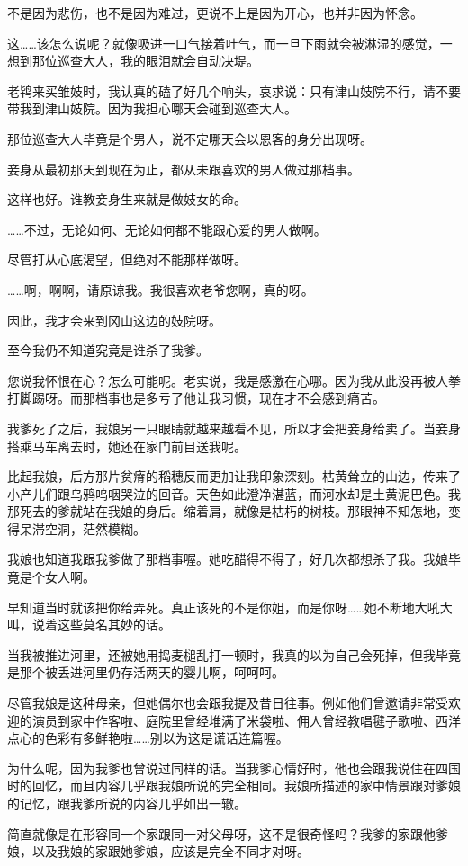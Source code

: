 \documentclass[portrait,a4paper]{article}
\begin{document}
不是因为悲伤，也不是因为难过，更说不上是因为开心，也并非因为怀念。

这……该怎么说呢？就像吸进一口气接着吐气，而一旦下雨就会被淋湿的感觉，一想到那位巡查大人，我的眼泪就会自动决堤。

老鸨来买雏妓时，我认真的磕了好几个响头，哀求说：只有津山妓院不行，请不要带我到津山妓院。因为我担心哪天会碰到巡查大人。

那位巡查大人毕竟是个男人，说不定哪天会以恩客的身分出现呀。

妾身从最初那天到现在为止，都从未跟喜欢的男人做过那档事。

这样也好。谁教妾身生来就是做妓女的命。

……不过，无论如何、无论如何都不能跟心爱的男人做啊。

尽管打从心底渴望，但绝对不能那样做呀。

……啊，啊啊，请原谅我。我很喜欢老爷您啊，真的呀。

因此，我才会来到冈山这边的妓院呀。

至今我仍不知道究竟是谁杀了我爹。

您说我怀恨在心？怎么可能呢。老实说，我是感激在心哪。因为我从此没再被人拳打脚踢呀。而那档事也是多亏了他让我习惯，现在才不会感到痛苦。

我爹死了之后，我娘另一只眼睛就越来越看不见，所以才会把妾身给卖了。当妾身搭乘马车离去时，她还在家门前目送我呢。

比起我娘，后方那片贫瘠的稻穗反而更加让我印象深刻。枯黄耸立的山边，传来了小产儿们跟乌鸦呜咽哭泣的回音。天色如此澄净湛蓝，而河水却是土黄泥巴色。我那死去的爹就站在我娘的身后。缩着肩，就像是枯朽的树枝。那眼神不知怎地，变得呆滞空洞，茫然模糊。

我娘也知道我跟我爹做了那档事喔。她吃醋得不得了，好几次都想杀了我。我娘毕竟是个女人啊。

早知道当时就该把你给弄死。真正该死的不是你姐，而是你呀……她不断地大吼大叫，说着这些莫名其妙的话。

当我被推进河里，还被她用捣麦槌乱打一顿时，我真的以为自己会死掉，但我毕竟是那个被丢进河里仍存活两天的婴儿啊，呵呵呵。

尽管我娘是这种母亲，但她偶尔也会跟我提及昔日往事。例如他们曾邀请非常受欢迎的演员到家中作客啦、庭院里曾经堆满了米袋啦、佣人曾经教唱毽子歌啦、西洋点心的色彩有多鲜艳啦……别以为这是谎话连篇喔。

为什么呢，因为我爹也曾说过同样的话。当我爹心情好时，他也会跟我说住在四国时的回忆，而且内容几乎跟我娘所说的完全相同。我娘所描述的家中情景跟对爹娘的记忆，跟我爹所说的内容几乎如出一辙。

简直就像是在形容同一个家跟同一对父母呀，这不是很奇怪吗？我爹的家跟他爹娘，以及我娘的家跟她爹娘，应该是完全不同才对呀。
\end{document}
